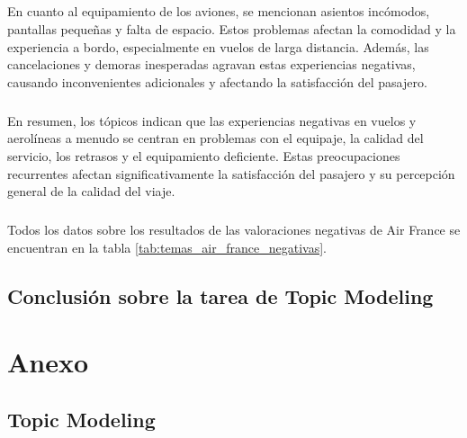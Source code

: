 \documentclass{report}
\begin{document}
                    \paragraph*{}{
                        En cuanto al equipamiento de los aviones, se mencionan asientos incómodos, pantallas pequeñas y falta de espacio. Estos problemas afectan la comodidad y la experiencia a bordo, especialmente en vuelos de larga distancia. Además, las cancelaciones y demoras inesperadas agravan estas experiencias negativas, causando inconvenientes adicionales y afectando la satisfacción del pasajero.
                    }
                    \paragraph*{}{
                        En resumen, los tópicos indican que las experiencias negativas en vuelos y aerolíneas a menudo se centran en problemas con el equipaje, la calidad del servicio, los retrasos y el equipamiento deficiente. Estas preocupaciones recurrentes afectan significativamente la satisfacción del pasajero y su percepción general de la calidad del viaje.
                    }
                    \paragraph*{}{
                        Todos los datos sobre los resultados de las valoraciones negativas de Air France se encuentran en la tabla \ref{tab:temas_air_france_negativas}.
                    }
        \clearpage\section{Conclusión sobre la tarea de Topic Modeling}
    \chapter{Anexo}
        \section{Topic Modeling}
\end{document}

